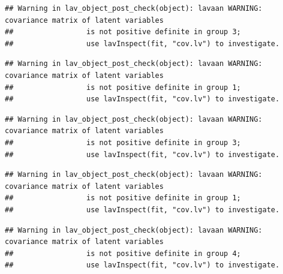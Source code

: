 \documentclass[
  english,
  man]{apa6}
\begin{document}
\begin{verbatim}
## Warning in lav_object_post_check(object): lavaan WARNING: covariance matrix of latent variables
##                 is not positive definite in group 3;
##                 use lavInspect(fit, "cov.lv") to investigate.
\end{verbatim}

\begin{verbatim}
## Warning in lav_object_post_check(object): lavaan WARNING: covariance matrix of latent variables
##                 is not positive definite in group 1;
##                 use lavInspect(fit, "cov.lv") to investigate.
\end{verbatim}

\begin{verbatim}
## Warning in lav_object_post_check(object): lavaan WARNING: covariance matrix of latent variables
##                 is not positive definite in group 3;
##                 use lavInspect(fit, "cov.lv") to investigate.
\end{verbatim}

\begin{verbatim}
## Warning in lav_object_post_check(object): lavaan WARNING: covariance matrix of latent variables
##                 is not positive definite in group 1;
##                 use lavInspect(fit, "cov.lv") to investigate.
\end{verbatim}

\begin{verbatim}
## Warning in lav_object_post_check(object): lavaan WARNING: covariance matrix of latent variables
##                 is not positive definite in group 4;
##                 use lavInspect(fit, "cov.lv") to investigate.
\end{verbatim}
\end{document}
